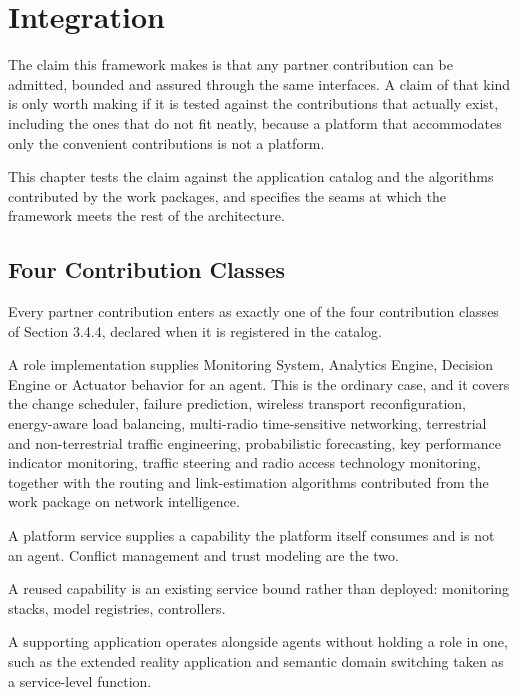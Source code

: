
\hypertarget{integration}{%
\section{Integration}\label{integration}}

The claim this framework makes is that any partner contribution can be
admitted, bounded and assured through the same interfaces. A claim of
that kind is only worth making if it is tested against the contributions
that actually exist, including the ones that do not fit neatly, because
a platform that accommodates only the convenient contributions is not a
platform.

This chapter tests the claim against the application catalog and the
algorithms contributed by the work packages, and specifies the seams at
which the framework meets the rest of the architecture.

\hypertarget{four-contribution-classes}{%
\subsection{Four Contribution Classes}\label{four-contribution-classes}}

Every partner contribution enters as exactly one of the four
contribution classes of Section 3.4.4, declared when it is registered in
the catalog.

A role implementation supplies Monitoring System, Analytics Engine,
Decision Engine or Actuator behavior for an agent. This is the ordinary
case, and it covers the change scheduler, failure prediction, wireless
transport reconfiguration, energy-aware load balancing, multi-radio
time-sensitive networking, terrestrial and non-terrestrial traffic
engineering, probabilistic forecasting, key performance indicator
monitoring, traffic steering and radio access technology monitoring,
together with the routing and link-estimation algorithms contributed
from the work package on network intelligence.

A platform service supplies a capability the platform itself consumes
and is not an agent. Conflict management and trust modeling are the two.

A reused capability is an existing service bound rather than deployed:
monitoring stacks, model registries, controllers.

A supporting application operates alongside agents without holding a
role in one, such as the extended reality application and semantic
domain switching taken as a service-level function.

